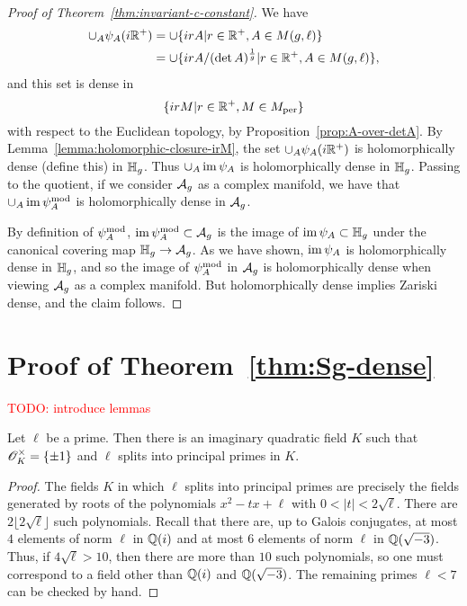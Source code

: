 \documentclass{amsart}
\begin{document}
\begin{proof}[Proof of Theorem~\ref{thm:invariant-c-constant}]
  We have
  \begin{align*}
    \cup_A \psi_A(i\mathbb{R}^+) &= \cup \{irA | r \in \mathbb{R}^+, A \in M(g,\ell)\} \\
               &= \cup \{irA/(\det A)^{\frac{1}{g}} | r \in \mathbb{R}^+, A \in M(g,\ell)\},
  \end{align*}
  and this set is dense in
  \[
    \{irM | r \in \mathbb{R}^+, M \in M_{\textrm{per}}\}
  \]
with respect to the Euclidean topology,  by Proposition~\ref{prop:A-over-detA}.
  By Lemma~\ref{lemma:holomorphic-closure-irM}, the set $\cup_A \psi_A(i\mathbb{R}^+)$ is holomorphically dense (define this) in $\mathbb{H}_g$. Thus $\cup_A \operatorname{im} \psi_A$ is holomorphically dense in $\mathbb{H}_g$. Passing to the quotient, if we consider $\mathcal{A}_g$ as a complex manifold, we have that $\cup_A \operatorname{im} \psi_{A}^\mathrm{mod}$ is holomorphically dense in $\mathcal{A}_g$.

  By definition of $\psi_{A}^\mathrm{mod}$,  $\operatorname{im} \psi_{A}^\mathrm{mod} \subset \mathcal{A}_g$ is the image of $\operatorname{im} \psi_A \subset \mathbb{H}_g$ under the canonical covering map $\mathbb{H}_g \to \mathcal{A}_g$. As we have shown, $\operatorname{im} \psi_A$ is holomorphically dense in $\mathbb{H}_g$, and so the image of $\psi_{A}^\mathrm{mod}$ in $\mathcal{A}_g$ is holomorphically dense when viewing $\mathcal{A}_g$ as a complex manifold. But holomorphically dense implies Zariski dense, and the claim follows.
\end{proof}



\section{Proof of Theorem~\ref{thm:Sg-dense}}
\label{sec:step-2}


\textcolor{red}{TODO: introduce lemmas}

\begin{lemma}\label{lem:silly}
  Let $\ell$ be a prime. Then there is an imaginary quadratic field $K$ such that $\mathscr{O}_K^\times = \{\pm 1\}$ and $\ell$ splits into principal primes in $K$.
\end{lemma}
\begin{proof}
  The fields $K$ in which $\ell$ splits into principal primes are precisely the fields generated by roots of the polynomials $x^2 - tx + \ell$ with $0 < |t| < 2\sqrt{\ell}$. There are $2\lfloor 2\sqrt{\ell} \rfloor$ such polynomials. Recall that there are, up to Galois conjugates, at most $4$ elements of norm $\ell$ in $\mathbb{Q}(i)$ and at most $6$ elements of norm $\ell$  in $\mathbb{Q}(\sqrt{-3})$. Thus, if $4\sqrt{\ell} > 10$, then there are more than $10$ such polynomials, so one must correspond to a field other than $\mathbb{Q}(i)$ and $\mathbb{Q}(\sqrt{-3})$. The remaining primes $\ell < 7$ can be checked by hand.
\end{proof}
\end{document}
